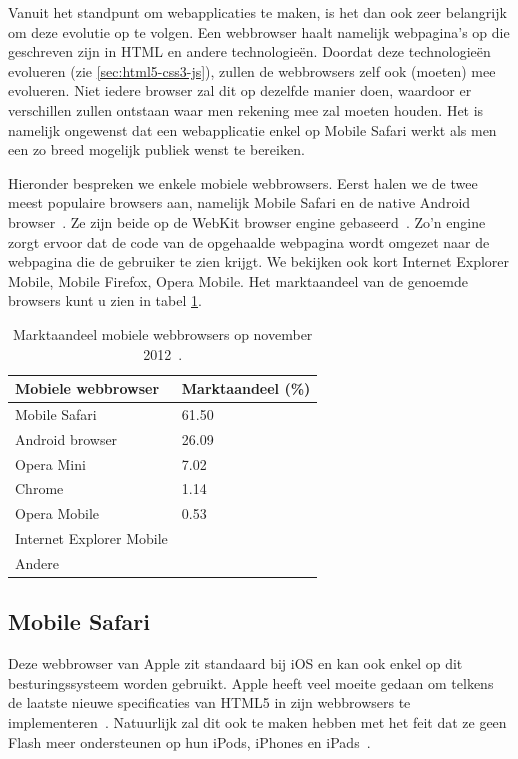Vanuit het standpunt om webapplicaties te maken, is het dan ook zeer belangrijk om deze evolutie op te volgen. Een webbrowser haalt namelijk webpagina's op die geschreven zijn in HTML en andere technologieën. Doordat deze technologieën evolueren (zie \ref{sec:html5-css3-js}), zullen de webbrowsers zelf ook (moeten) mee evolueren. Niet iedere browser zal dit op dezelfde manier doen, waardoor er verschillen zullen ontstaan waar men rekening mee zal moeten houden. Het is namelijk ongewenst dat een webapplicatie enkel op Mobile Safari werkt als men een zo breed mogelijk publiek wenst te bereiken. 

Hieronder bespreken we enkele mobiele webbrowsers. Eerst halen we de twee meest populaire browsers aan, namelijk Mobile Safari en de native Android browser~\cite{Hales2012}. Ze zijn beide op de WebKit browser engine gebaseerd~\cite{Oeflman2011}. Zo'n engine zorgt ervoor dat de code van de opgehaalde webpagina wordt omgezet naar de webpagina die de gebruiker te zien krijgt. We bekijken ook kort Internet Explorer Mobile, Mobile Firefox, Opera Mobile. Het marktaandeel van de genoemde browsers kunt u zien in tabel \ref{tbl:marktaandeel-browsers}.

\begin{table}
\begin{center}
\begin{tabular}{ll}
\hline
\textbf{Mobiele webbrowser} & \textbf{Marktaandeel} (\%) \\
\hline
\hline
Mobile Safari			& 61.50 \\
Android browser			& 26.09 \\
Opera Mini				& 7.02 	\\
Chrome					& 1.14 	\\
Opera Mobile				& 0.53 	\\
Internet Explorer Mobile & 		\\
Andere					& 		\\
\hline
\end{tabular}
\caption{Marktaandeel mobiele webbrowsers op november 2012~\cite{NetApplications2012}.}
\label{tbl:marktaandeel-browsers}
\end{center}
\end{table}

\subsection{Mobile Safari}
\label{sec:mobile-safari}
Deze webbrowser van Apple zit standaard bij iOS en kan ook enkel op dit besturingssysteem worden gebruikt. Apple heeft veel moeite gedaan om telkens de laatste nieuwe specificaties van HTML5 in zijn webbrowsers te implementeren~\cite{Hales2012}. Natuurlijk zal dit ook te maken hebben met het feit dat ze geen Flash meer ondersteunen op hun iPods, iPhones en iPads~\cite{Jobs2010}.

